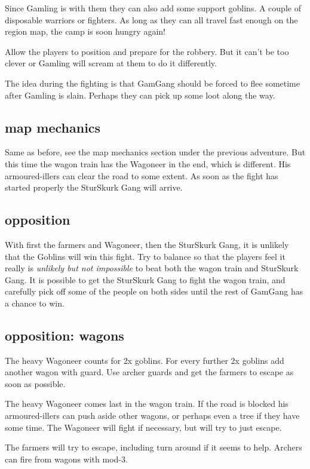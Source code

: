\noindent Since Gamling is with them they can also add some support goblins. A couple of disposable warriors or fighters. As long as they can all travel fast enough on the region map, the camp is soon hungry again!

Allow the players to position and prepare for the robbery. But it can't be too clever or Gamling will scream at them to do it differently.

The idea during the fighting is that GamGang should be forced to flee sometime after Gamling is slain. Perhaps they can pick up some loot along the way.


\subsection*{map mechanics}

Same as before, see the map mechanics section under the previous adventure.
But this time the wagon train has the Wagoneer in the end, which is different. His armoured-illers can clear the road to some extent.
As soon as the fight has started properly the SturSkurk Gang will arrive.


\subsection*{opposition}

With first the farmers and Wagoneer, then the SturSkurk Gang, it is unlikely that the Goblins will win this fight. Try to balance so that the players feel it really is \emph{unlikely but not impossible} to beat both the wagon train and SturSkurk Gang. It is possible to get the SturSkurk Gang to fight the wagon train, and carefully pick off some of the people on both sides until the rest of GamGang has a chance to win.


\subsection*{opposition: wagons}

The heavy Wagoneer counts for 2x goblins. For every further 2x goblins add another wagon with guard. Use archer guards and get the farmers to escape as soon as possible.

The heavy Wagoneer comes last in the wagon train. If the road is blocked his armoured-illers can push aside other wagons, or perhaps even a tree if they have some time. The Wagoneer will fight if necessary, but will try to just escape.

The farmers will try to escape, including turn around if it seems to help. Archers can fire from wagons with mod-3.


